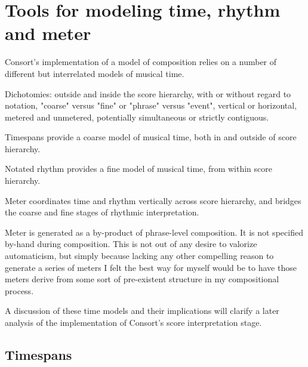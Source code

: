 \chapter{Tools for modeling time, rhythm and meter}

\begin{comment}
<abjad>[hide=true]
import consort
</abjad>
\end{comment}

Consort's implementation of a model of composition relies on a number of
different but interrelated models of musical time.

Dichotomies: outside and inside the score hierarchy, with or without regard to
notation, "coarse" versus "fine" or "phrase" versus "event", vertical or
horizontal, metered and unmetered, potentially simultaneous or strictly
contiguous.

Timespans provide a coarse model of musical time, both in and outside of score
hierarchy.

Notated rhythm provides a fine model of musical time, from within score
hierarchy.

Meter coordinates time and rhythm vertically across score hierarchy, and
bridges the coarse and fine stages of rhythmic interpretation.

Meter is generated as a by-product of phrase-level composition. It is not
specified by-hand during composition. This is not out of any desire to valorize
automaticism, but simply because lacking any other compelling reason to
generate a series of meters I felt the best way for myself would be to have
those meters derive from some sort of pre-existent structure in my
compositional process.

A discussion of these time models and their implications will clarify a later
analysis of the implementation of Consort's score interpretation
stage.

\section{Timespans}

\begin{comment}
<abjad>
timespan = timespantools.Timespan(
    start_offset=Offset(1, 4),
    stop_offset=Offset(3, 2),
    )
</abjad>
\end{comment}

